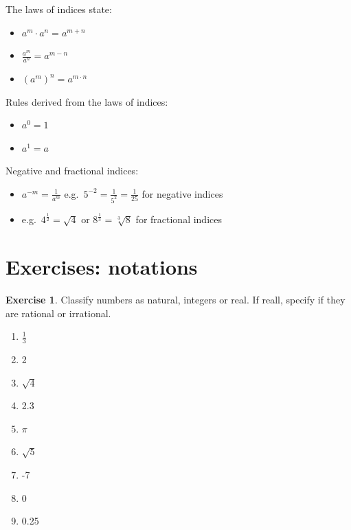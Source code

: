 \documentclass[
]{book}
\providecommand{\tightlist}{%
  \setlength{\itemsep}{0pt}\setlength{\parskip}{0pt}}
\theoremstyle{definition}
\theoremstyle{definition}
\theoremstyle{definition}
\newtheorem{exercise}{Exercise}[chapter]
\theoremstyle{remark}
\begin{document}
The laws of indices state:

\begin{itemize}
\tightlist
\item
  \(a^m \cdot a^n = a^{m+n}\)
\item
  \(\frac{a^m}{a^n} = a^{m-n}\)
\item
  \((a^m)^n = a^{m\cdot n}\)
\end{itemize}

Rules derived from the laws of indices:

\begin{itemize}
\tightlist
\item
  \(a^0 = 1\)
\item
  \(a^1 = a\)
\end{itemize}

Negative and fractional indices:

\begin{itemize}
\tightlist
\item
  \(a^{-m} = \frac{1}{a^m}\) e.g.~\(5^{-2} = \frac{1}{5^2} = \frac{1}{25}\) for negative indices
\item
  e.g.~\(4^{\frac{1}{2}} = \sqrt{4}\) or \(8^{\frac{1}{3}} = \sqrt[3]{8}\) for fractional indices
\end{itemize}

\hypertarget{exercises-notations}{%
\section{Exercises: notations}\label{exercises-notations}}

\begin{exercise}
\protect\hypertarget{exr:m-notations-numbers}{}{\label{exr:m-notations-numbers} }
Classify numbers as natural, integers or real. If reall, specify if they are rational or irrational.

\begin{enumerate}
\def\labelenumi{\alph{enumi})}
\tightlist
\item
  \(\frac{1}{3}\)
\item
  2
\item
  \(\sqrt{4}\)
\item
  2.3
\item
  \(\pi\)
\item
  \(\sqrt{5}\)
\item
  -7
\item
  0
\item
  0.25
\end{enumerate}
\end{exercise}
\end{document}
